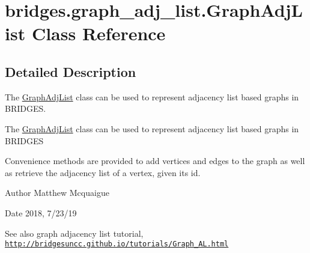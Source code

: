 \hypertarget{classbridges_1_1graph__adj__list_1_1_graph_adj_list}{}\section{bridges.\+graph\+\_\+adj\+\_\+list.\+Graph\+Adj\+List Class Reference}
\label{classbridges_1_1graph__adj__list_1_1_graph_adj_list}


\subsection{Detailed Description}
The \hyperlink{classbridges_1_1graph__adj__list_1_1_graph_adj_list}{Graph\+Adj\+List} class can be used to represent adjacency list based graphs in B\+R\+I\+D\+G\+ES. 

The \hyperlink{classbridges_1_1graph__adj__list_1_1_graph_adj_list}{Graph\+Adj\+List} class can be used to represent adjacency list based graphs in B\+R\+I\+D\+G\+ES

Convenience methods are provided to add vertices and edges to the graph as well as retrieve the adjacency list of a vertex, given its id.

\begin{DoxyAuthor}{Author}
Matthew Mcquaigue 
\end{DoxyAuthor}
\begin{DoxyDate}{Date}
2018, 7/23/19
\end{DoxyDate}
\begin{DoxySeeAlso}{See also}
graph adjacency list tutorial, \href{http://bridgesuncc.github.io/tutorials/Graph_AL.html}{\tt http\+://bridgesuncc.\+github.\+io/tutorials/\+Graph\+\_\+\+A\+L.\+html} 
\end{DoxySeeAlso}
